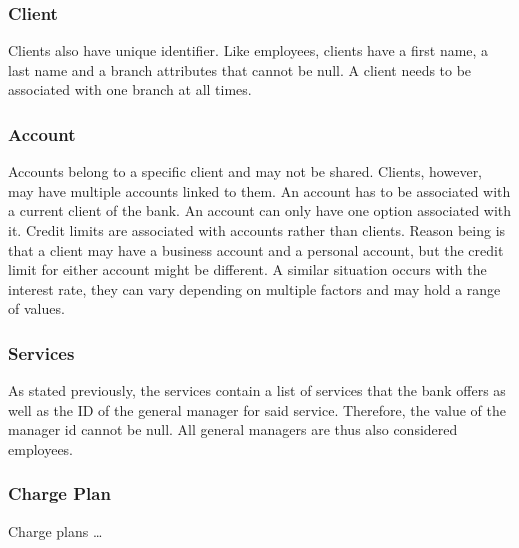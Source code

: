 \documentclass[letterpaper, 12pt]{article}
\begin{document}
\subsubsection{Client}
Clients also have unique identifier.
Like employees, clients have a first name, a last name and a branch attributes that cannot be null.
A client needs to be associated with one branch at all times.

\subsubsection{Account}
Accounts belong to a specific client and may not be shared.
Clients, however, may have multiple accounts linked to them.
An account has to be associated with a current client of the bank.
An account can only have one option associated with it.%
Credit limits are associated with accounts rather than clients.
Reason being is that a client may have a business account and a personal account, but the credit limit for either account might be different.
A similar situation occurs with the interest rate, they can vary depending on multiple factors and may hold a range of values.


\subsubsection{Services}
As stated previously, the services contain a list of services that the bank offers as well as the ID of the general manager for said service.
Therefore, the value of the manager id cannot be null. All general managers are thus also considered employees.

\subsubsection{Charge Plan}
Charge plans \ldots
\end{document}
